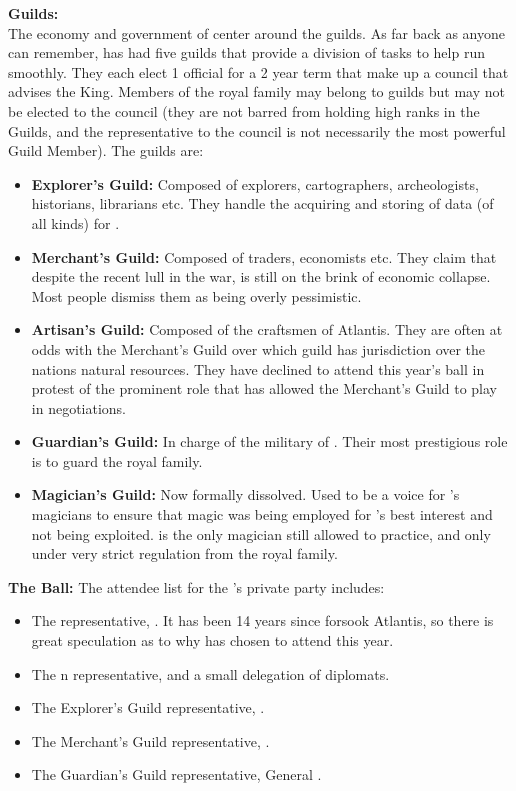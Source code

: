 \documentclass[blue]{NeptuneBall}
\begin{document}
{\bf Guilds:}\\
The economy and government of \pAtlantis{} center around the guilds. As far back as anyone can remember, \pAtlantis{} has had five guilds that provide a division of tasks to help \pAtlantis{} run smoothly. They each elect 1 official for a 2 year term that make up a council that advises the King.  Members of the royal family may belong to guilds but may not be elected to the council (they are not barred from holding high ranks in the Guilds, and the representative to the council is not necessarily the most powerful Guild Member). The guilds are:
\begin{itemize}
  \item {\bf Explorer's Guild:} Composed of explorers, cartographers, archeologists, historians, librarians etc. They handle the acquiring and storing of data (of all kinds) for \pAtlantis{}.
  \item{\bf Merchant's Guild:} Composed of traders, economists etc. They claim that despite the recent lull in the war, \pAtlantis{} is  still on the brink of economic collapse. Most people dismiss them as being overly pessimistic.
  \item {\bf Artisan's Guild:} Composed of the craftsmen of Atlantis. They are often at odds with the Merchant's Guild over which guild has jurisdiction over the nations natural resources. They have declined to attend this year's ball in protest of the prominent role that \cKing{\King} \cKing{} has allowed the Merchant's Guild to play in negotiations.
  \item {\bf Guardian's Guild:} In charge of the military of \pAtlantis{}. Their most prestigious role is to guard the royal family.
  \item {\bf Magician's Guild:}  Now formally dissolved. Used to be a voice for \pAtlantis{}'s magicians to ensure that magic was being employed for \pAtlantis{}'s best interest and not being exploited. \cManta{} is the only magician still allowed to practice, and only under very strict regulation from the royal family.\\
\end{itemize}

{\bf The \cExExKing{} Ball:}
The attendee list for the \cKing{\King}'s private party includes:
\begin{itemize}
  \item The \pAmerica{} representative, \cAriel{\King} \cAriel{}. It has been 14 years since \cAriel{\MYname{}} forsook Atlantis, so there is great speculation as to why \cAriel{\they} has chosen to attend this year.
  \item The \pPacifica{}n representative, \cPrince{\Prince} \cPrince{} and a small delegation of diplomats.
  \item The Explorer's Guild representative, \cPriest{}.
  \item The Merchant's Guild representative, \cSlave{}.
  \item The Guardian's Guild representative, General \cGeneral{}.
\end{itemize}
\end{document}
